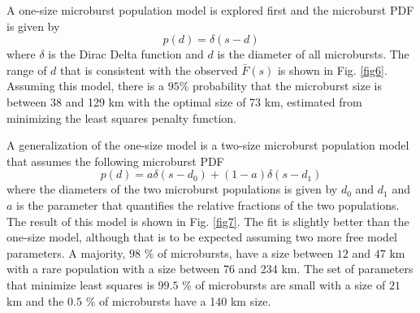 \documentclass[draft]{agujournal2019}
\begin{document}
A one-size microburst population model is explored first and the microburst PDF is given by 
\begin{equation}
p(d) = \delta(s-d)
\end{equation} where $\delta$ is the Dirac Delta function and $d$ is the diameter of all microbursts. The range of $d$ that is consistent with the observed $\bar{F}(s)$ is shown in Fig. \ref{fig6}. Assuming this model, there is a $95 \%$ probability that the microburst size is between 38 and 129 km with the optimal size of 73 km, estimated from minimizing the least squares penalty function. 

A generalization of the one-size model is a two-size microburst population model that assumes the following microburst PDF
\begin{equation}
p(d) = a \delta(s-d_0) + (1-a)\delta(s-d_1)
\end{equation} where the diameters of the two microburst populations is given by $d_0$ and $d_1$ and $a$ is the parameter that quantifies the relative fractions of the two populations. The result of this model is shown in Fig. \ref{fig7}. The fit is slightly better than the one-size model, although that is to be expected assuming two more free model parameters. A majority, $98$ \% of microbursts, have a size between $12$ and $47$ km with a rare population with a size between 76 and 234 km. The set of parameters that minimize least squares is $99.5$ \% of microbursts are small with a size of $21$ km and the $0.5$ \% of microbursts have a 140 km size.
\end{document}
